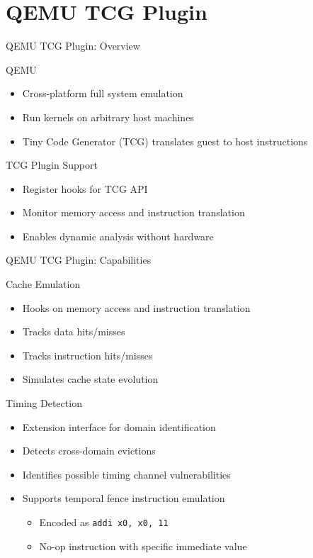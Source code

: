 \section{QEMU TCG Plugin}

\begin{frame}{QEMU TCG Plugin: Overview}
	\begin{block}{QEMU}
		\begin{itemize}
			\item Cross-platform full system emulation
			\item Run kernels on arbitrary host machines
			\item Tiny Code Generator (TCG) translates guest to host instructions
		\end{itemize}
	\end{block}

	\vspace{0.3cm}

	\begin{block}{TCG Plugin Support}
		\begin{itemize}
			\item Register hooks for TCG API
			\item Monitor memory access and instruction translation
			\item Enables dynamic analysis without hardware
		\end{itemize}
	\end{block}
\end{frame}

\begin{frame}{QEMU TCG Plugin: Capabilities}
	\begin{block}{Cache Emulation}
		\begin{itemize}
			\item Hooks on memory access and instruction translation
			\item Tracks data hits/misses
			\item Tracks instruction hits/misses
			\item Simulates cache state evolution
		\end{itemize}
	\end{block}

	\vspace{0.3cm}
  \pause

	\begin{block}{Timing Detection}
		\begin{itemize}
			\item Extension interface for domain identification
			\item Detects cross-domain evictions
			\item Identifies possible timing channel vulnerabilities
			\item Supports temporal fence instruction emulation
        \begin{itemize}
          \item Encoded as \texttt{addi x0, x0, 11}
          \item No-op instruction with specific immediate value
        \end{itemize}
		\end{itemize}
	\end{block}
\end{frame}
